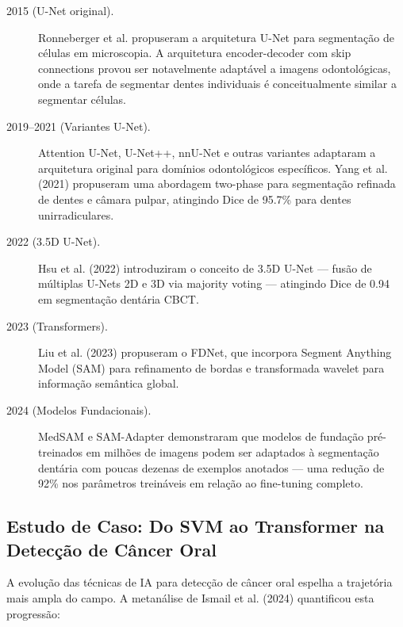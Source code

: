 \begin{description}
    \item[2015 (U-Net original).] Ronneberger et al. propuseram a arquitetura U-Net para segmentação de células em microscopia. A arquitetura encoder-decoder com skip connections provou ser notavelmente adaptável a imagens odontológicas, onde a tarefa de segmentar dentes individuais é conceitualmente similar a segmentar células.
    \item[2019--2021 (Variantes U-Net).] Attention U-Net, U-Net++, nnU-Net e outras variantes adaptaram a arquitetura original para domínios odontológicos específicos. Yang et al. (2021) \cite{ODT-035} propuseram uma abordagem two-phase para segmentação refinada de dentes e câmara pulpar, atingindo Dice de 95.7\% para dentes unirradiculares.
    \item[2022 (3.5D U-Net).] Hsu et al. (2022) \cite{ODT-032} introduziram o conceito de 3.5D U-Net — fusão de múltiplas U-Nets 2D e 3D via majority voting — atingindo Dice de 0.94 em segmentação dentária CBCT.
    \item[2023 (Transformers).] Liu et al. (2023) \cite{ODT-033} propuseram o FDNet, que incorpora Segment Anything Model (SAM) para refinamento de bordas e transformada wavelet para informação semântica global.
    \item[2024 (Modelos Fundacionais).] MedSAM \cite{DL-ODT-019} e SAM-Adapter \cite{DL-ODT-017} demonstraram que modelos de fundação pré-treinados em milhões de imagens podem ser adaptados à segmentação dentária com poucas dezenas de exemplos anotados — uma redução de 92\% nos parâmetros treináveis em relação ao fine-tuning completo.
\end{description}

\subsection{Estudo de Caso: Do SVM ao Transformer na Detecção de Câncer Oral}

A evolução das técnicas de IA para detecção de câncer oral espelha a trajetória mais ampla do campo. A metanálise de Ismail et al. (2024) \cite{ODT-023} quantificou esta progressão:

